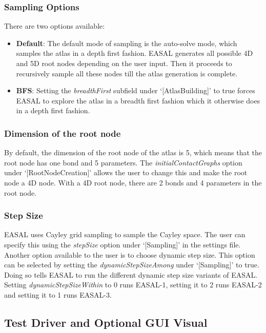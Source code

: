 \documentclass[10pt]{article}
\begin{document}
\subsubsection{Sampling Options} 
There are two options available:
\begin{itemize}
\item \textbf{Default}: The default mode of sampling is the auto-solve mode, which samples the atlas in a depth
first fashion. EASAL generates all possible 4D and 5D root nodes depending on the user input. Then
it proceeds to recursively sample all these nodes till the atlas generation is complete.

\item \textbf{BFS}: Setting the \emph{breadthFirst} subfield under `[AtlasBuilding]' to true forces EASAL to explore the
atlas in a breadth first fashion which it otherwise does in a depth first fashion.

\end{itemize}

\subsubsection{Dimension of the root node}
By default, the dimension of the root node of the atlas is 5, which means that the root node has one bond
and 5 parameters. The \emph{initialContactGraphs} option under `[RootNodeCreation]' allows the
user to change this and make the root node a 4D node. With a 4D root node, there are 2 bonds and 4
parameters in the root node.

\subsubsection{Step Size}
EASAL uses Cayley grid sampling to sample the Cayley space. The user can specify this using the \emph{stepSize}
option under `[Sampling]' in the settings file. Another option available to the user is to choose dynamic step
size. This option can be selected by setting the \emph{dynamicStepSizeAmong} under `[Sampling]' to true. Doing
so tells EASAL to run the different dynamic step size variants of EASAL. Setting \emph{dynamicStepSizeWithin}
to 0 runs EASAL-1, setting it to 2 runs EASAL-2 and setting it to 1 runs EASAL-3.

\subsection{Test Driver and Optional GUI Visual}
\end{document}
